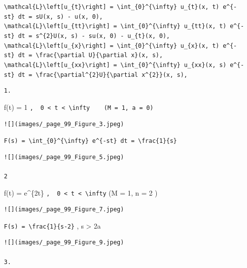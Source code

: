 \documentclass[
  ukrainian,
]{article}
\begin{document}
\texttt{\textbackslash{}mathcal\{L\}\textbackslash{}left{[}u\_\{t\}\textbackslash{}right{]}\ =\ \textbackslash{}int\_\{0\}\^{}\{\textbackslash{}infty\}\ u\_\{t\}(x,\ t)\ e\^{}\{-st\}\ dt\ =\ sU(x,\ s)\ -\ u(x,\ 0),}
\texttt{\textbackslash{}mathcal\{L\}\textbackslash{}left{[}u\_\{tt\}\textbackslash{}right{]}\ =\ \textbackslash{}int\_\{0\}\^{}\{\textbackslash{}infty\}\ u\_\{tt\}(x,\ t)\ e\^{}\{-st\}\ dt\ =\ s\^{}\{2\}U(x,\ s)\ -\ su(x,\ 0)\ -\ u\_\{t\}(x,\ 0),}
\texttt{\textbackslash{}mathcal\{L\}\textbackslash{}left{[}u\_\{x\}\textbackslash{}right{]}\ =\ \textbackslash{}int\_\{0\}\^{}\{\textbackslash{}infty\}\ u\_\{x\}(x,\ t)\ e\^{}\{-st\}\ dt\ =\ \textbackslash{}frac\{\textbackslash{}partial\ U\}\{\textbackslash{}partial\ x\}(x,\ s),}
\texttt{\textbackslash{}mathcal\{L\}\textbackslash{}left{[}u\_\{xx\}\textbackslash{}right{]}\ =\ \textbackslash{}int\_\{0\}\^{}\{\textbackslash{}infty\}\ u\_\{xx\}(x,\ s)\ e\^{}\{-st\}\ dt\ =\ \textbackslash{}frac\{\textbackslash{}partial\^{}\{2\}U\}\{\textbackslash{}partial\ x\^{}\{2\}\}(x,\ s),}

\begin{verbatim}
1.
\end{verbatim}

f(t) = 1
\texttt{,\ \ 0\ \textless{}\ t\ \textless{}\ \textbackslash{}infty\ \ \ \ (M\ =\ 1,\ a\ =\ 0)}

\begin{verbatim}
![](images/_page_99_Figure_3.jpeg)
\end{verbatim}

\texttt{F(s)\ =\ \textbackslash{}int\_\{0\}\^{}\{\textbackslash{}infty\}\ e\^{}\{-st\}\ dt\ =\ \textbackslash{}frac\{1\}\{s\}}

\begin{verbatim}
![](images/_page_99_Figure_5.jpeg)

2
\end{verbatim}

f(t) = e\^{}\{2t\}
\texttt{,\ \ 0\ \textless{}\ t\ \textless{}\ \textbackslash{}infty} (M =
1, n = 2 )

\begin{verbatim}
![](images/_page_99_Figure_7.jpeg)
\end{verbatim}

\texttt{F(s)\ =\ \textbackslash{}frac\{1\}\{s-2\}} , s \textgreater{} 2a

\begin{verbatim}
![](images/_page_99_Figure_9.jpeg)

3.
\end{verbatim}
\end{document}
